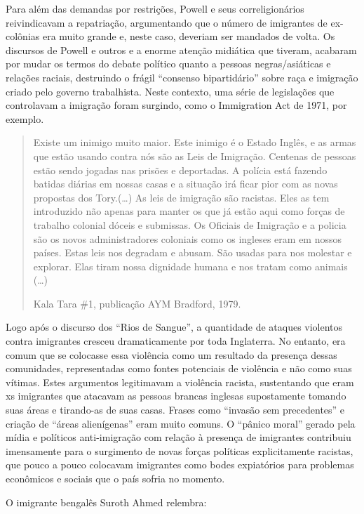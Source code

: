 Para além das demandas por restrições, Powell e seus correligionários reivindicavam a repatriação, argumentando que o número de imigrantes de ex-colônias era muito grande e, neste caso, deveriam ser mandados de volta. Os discursos de Powell e outros e a enorme atenção midiática que tiveram, acabaram por mudar os termos do debate político quanto a pessoas negras/asiáticas e relações raciais, destruindo o frágil “consenso bipartidário” sobre raça e imigração criado pelo governo trabalhista. Neste contexto, uma série de legislações que controlavam a imigração foram surgindo, como o Immigration Act de 1971, por exemplo.

\begin{quote}
Existe um inimigo muito maior. Este inimigo é o Estado Inglês, e as armas que estão usando contra nós são as Leis de Imigração. Centenas de pessoas estão sendo jogadas nas prisões e deportadas. A polícia está fazendo batidas diárias em nossas casas e a situação irá ficar pior com as novas propostas dos Tory.(…) As leis de imigração são racistas. Eles as tem introduzido não apenas para manter os que já estão aqui como forças de trabalho colonial dóceis e submissas. Os Oficiais de Imigração e a policia são os novos administradores coloniais como os ingleses eram em nossos países. Estas leis nos degradam e abusam. São usadas para nos molestar e explorar. Elas tiram nossa dignidade humana e nos tratam como animais (…)

Kala Tara \#1, publicação AYM Bradford, 1979.
\end{quote}

Logo após o discurso dos “Rios de Sangue”, a quantidade de ataques violentos contra imigrantes cresceu dramaticamente por toda Inglaterra. No entanto, era comum que se colocasse essa violência como um resultado da presença dessas comunidades, representadas como fontes potenciais de violência e não como suas vítimas. Estes argumentos legitimavam a violência racista, sustentando que eram xs imigrantes que atacavam as pessoas brancas inglesas supostamente tomando suas áreas e tirando-as de suas casas. Frases como “invasão sem precedentes” e criação de “áreas alienígenas” eram muito comuns. O “pânico moral” gerado pela mídia e políticos anti-imigração com relação à presença de imigrantes contribuiu imensamente para o surgimento de novas forças políticas explicitamente racistas, que pouco a pouco colocavam imigrantes como bodes expiatórios para problemas econômicos e sociais que o país sofria no momento.

O imigrante bengalês Suroth Ahmed relembra:

